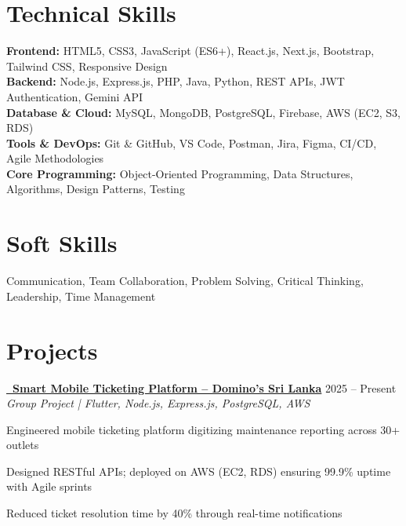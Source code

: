 \documentclass[letterpaper,10pt]{article}
\newenvironment{resume_list}{
  \vspace{-1pt}
  \begin{itemize}[itemsep=2pt, leftmargin=14pt]
}{
  \end{itemize}\vspace{-2pt}
}
\begin{document}
\section{Technical Skills}
\vspace{-1pt}

\textbf{Frontend:} HTML5, CSS3, JavaScript (ES6+), React.js, Next.js, Bootstrap, Tailwind CSS, Responsive Design\\[2pt]
\textbf{Backend:} Node.js, Express.js, PHP, Java, Python, REST APIs, JWT Authentication, Gemini API\\[2pt]
\textbf{Database \& Cloud:} MySQL, MongoDB, PostgreSQL, Firebase, AWS (EC2, S3, RDS)\\[2pt]
\textbf{Tools \& DevOps:} Git \& GitHub, VS Code, Postman, Jira, Figma, CI/CD, Agile Methodologies\\[2pt]
\textbf{Core Programming:} Object-Oriented Programming, Data Structures, Algorithms, Design Patterns, Testing

\section{Soft Skills}
\vspace{-1pt}
Communication, Team Collaboration, Problem Solving, Critical Thinking, Leadership, Time Management

\section{Projects}
\vspace{-1pt}

\href{https://github.com/fixpoint-tech}{\textbf{\faGithub~Smart Mobile Ticketing Platform – Domino's Sri Lanka}} \hfill 2025 – Present\\
\textit{Group Project | Flutter, Node.js, Express.js, PostgreSQL, AWS}
\begin{resume_list}
  \item Engineered mobile ticketing platform digitizing maintenance reporting across 30+ outlets
  \item Designed RESTful APIs; deployed on AWS (EC2, RDS) ensuring 99.9\% uptime with Agile sprints
  \item Reduced ticket resolution time by 40\% through real-time notifications
\end{resume_list}
\end{document}
